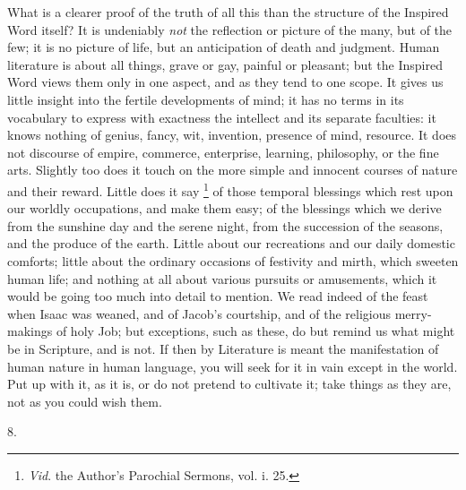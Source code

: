 What is a clearer proof of the truth of all this than the structure
of the Inspired Word itself? It is undeniably \emph{not} the
reflection or picture of the many, but of the few; it is no picture of
life, but an anticipation of death and judgment. Human literature is
about all things, grave or gay, painful or pleasant; but the Inspired
Word views them only in one aspect, and as they tend to one scope. It
gives us little insight into the fertile developments of mind; it has
no terms in its vocabulary to express with exactness the intellect and
its separate faculties: it knows nothing of genius, fancy, wit,
invention, presence of mind, resource. It does not discourse of
empire, commerce, enterprise, learning, philosophy, or the fine arts.
Slightly too does it touch on the more simple and innocent courses of
nature and their reward. Little does it say \footnote{\emph{Vid}. the
Author's Parochial Sermons, vol.
i. 25.} of those temporal blessings which rest upon our worldly
occupations, and make them easy; of the blessings which we derive from
the sunshine day and the serene night, from the succession of the
seasons, and the produce of the earth. Little about our recreations
and our daily domestic comforts; little about the ordinary occasions
of festivity and mirth, which sweeten human life; and nothing at all
about various pursuits or amusements, which it would be going too much
into detail to mention. We read indeed of the feast when Isaac
was weaned, and of Jacob's courtship, and of the religious
merry-makings of holy Job; but exceptions, such as these, do but
remind us what might be in Scripture, and is not. If then by
Literature is meant the manifestation of human nature in human
language, you will seek for it in vain except in the world. Put up
with it, as it is, or do not pretend to cultivate it; take things as
they are, not as you could wish them.

8.

